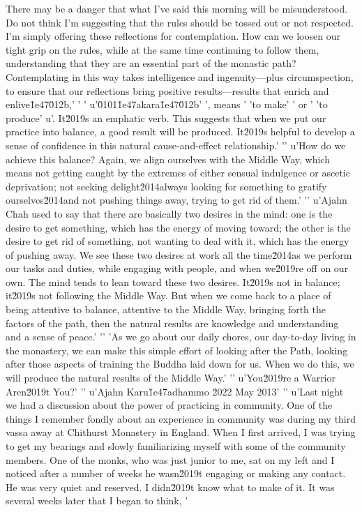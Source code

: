 There may be a danger that what I've said this morning will be 
misunderstood. Do not think I'm suggesting that the rules should be 
tossed out or not respected. I'm simply offering these reflections for 
contemplation. How can we loosen our tight grip on the rules, while at 
the same time continuing to follow them, understanding that they are an 
essential part of the monastic path? Contemplating in this way takes 
intelligence and ingenuity---plus circumspection, to ensure that our 
reflections bring positive results---results that enrich and enlive\u1e47\u012b,'
' '
u'\u0101\u1e47akara\u1e47\u012b'
', means '
'to make'
' or '
'to produce'
u'. It\u2019s an emphatic verb. This suggests that when we put our practice into balance, a good result will be produced. It\u2019s helpful to develop a sense of confidence in this natural cause-and-effect relationship.'
'\n'
u'How do we achieve this balance? Again, we align ourselves with the Middle Way, which means not getting caught by the extremes of either sensual indulgence or ascetic deprivation; not seeking delight\u2014always looking for something to gratify ourselves\u2014and not pushing things away, trying to get rid of them.'
'\n'
u'Ajahn Chah used to say that there are basically two desires in the mind: one is the desire to get something, which has the energy of moving toward; the other is the desire to get rid of something, not wanting to deal with it, which has the energy of pushing away. We see these two desires at work all the time\u2014as we perform our tasks and duties, while engaging with people, and when we\u2019re off on our own. The mind tends to lean toward these two desires. It\u2019s not in balance; it\u2019s not following the Middle Way. But when we come back to a place of being attentive to balance, attentive to the Middle Way, bringing forth the factors of the path, then the natural results are knowledge and understanding and a sense of peace.'
'\n'
'As we go about our daily chores, our day-to-day living in the monastery, we can make this simple effort of looking after the Path, looking after those aspects of training the Buddha laid down for us. When we do this, we will produce the natural results of the Middle Way.'
'\n'
u'You\u2019re a Warrior Aren\u2019t You?'
'\n'
u'Ajahn Karu\u1e47adhammo \u2022 May 2013'
'\n'
u'Last night we had a discussion about the power of practicing in community. One of the things I remember fondly about an experience in community was during my third vassa away at Chithurst Monastery in England. When I first arrived, I was trying to get my bearings and slowly familiarizing myself with some of the community members. One of the monks, who was just junior to me, sat on my left and I noticed after a number of weeks he wasn\u2019t engaging or making any contact. He was very quiet and reserved. I didn\u2019t know what to make of it. It was several weeks later that I began to think, '
